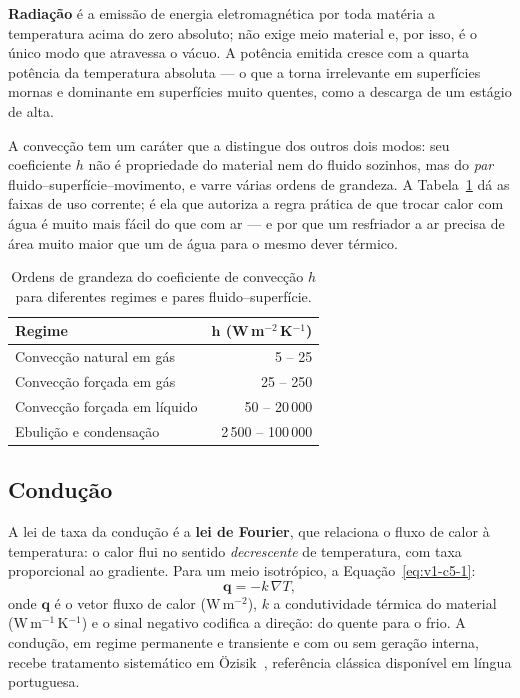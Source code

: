 \documentclass[12pt,a4paper]{article}
\numberwithin{equation}{section}
\numberwithin{table}{section}
\numberwithin{figure}{section}
\begin{document}
\textbf{Radiação} é a emissão de energia eletromagnética por toda matéria a
temperatura acima do zero absoluto; não exige meio material e, por isso, é o
único modo que atravessa o vácuo. A potência emitida cresce com a quarta
potência da temperatura absoluta --- o que a torna irrelevante em
superfícies mornas e dominante em superfícies muito quentes, como a descarga
de um estágio de alta.

A convecção tem um caráter que a distingue dos outros dois modos: seu
coeficiente $h$ não é propriedade do material nem do fluido sozinhos, mas do
\emph{par} fluido--superfície--movimento, e varre várias ordens de
grandeza. A Tabela~\ref{tab:v1-c5-1} dá as faixas de uso corrente; é ela que
autoriza a regra prática de que trocar calor com água é muito mais fácil do
que com ar --- e por que um resfriador a ar precisa de área muito maior que
um de água para o mesmo dever térmico.

\begin{table}[H]
\centering
\caption[Ordens de grandeza do coeficiente de convecção $h$.]{Ordens de
grandeza do coeficiente de convecção $h$ para diferentes regimes e pares
fluido--superfície.}
\label{tab:v1-c5-1}
\begin{tabular}{@{}lr@{}}
\toprule
\textbf{Regime} & $\bm{h}$ \textbf{(W\,m$^{-2}$\,K$^{-1}$)} \\
\midrule
Convecção natural em gás & 5 -- 25 \\
Convecção forçada em gás & 25 -- 250 \\
Convecção forçada em líquido & 50 -- 20\,000 \\
Ebulição e condensação & 2\,500 -- 100\,000 \\
\bottomrule
\end{tabular}
\end{table}

\subsection{Condução}\label{sub:v1-c5-conducao}

A lei de taxa da condução é a \textbf{lei de Fourier}, que relaciona o fluxo
de calor à temperatura: o calor flui no sentido \emph{decrescente} de
temperatura, com taxa proporcional ao gradiente. Para um meio isotrópico, a
Equação~\eqref{eq:v1-c5-1}:
\begin{equation}\label{eq:v1-c5-1}
\mathbf{q} = -k \, \nabla T,
\end{equation}
onde $\mathbf{q}$ é o vetor fluxo de calor (W\,m$^{-2}$), $k$ a
condutividade térmica do material (W\,m$^{-1}$\,K$^{-1}$) e o sinal negativo
codifica a direção: do quente para o frio. A condução, em regime permanente
e transiente e com ou sem geração interna, recebe tratamento sistemático em
Özisik~\cite{ozisik1990}, referência clássica disponível em língua portuguesa.
\end{document}
